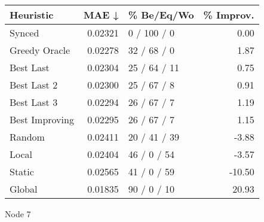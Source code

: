 \begin{tabular}{lrlr}
\toprule
\textbf{Heuristic} & \textbf{MAE ↓} & \textbf{\% Be/Eq/Wo} & \textbf{\% Improv.} \\
\midrule
            Synced &        0.02321 &          0 / 100 / 0 &                0.00 \\
     Greedy Oracle &        0.02278 &          32 / 68 / 0 &                1.87 \\
         Best Last &        0.02304 &         25 / 64 / 11 &                0.75 \\
       Best Last 2 &        0.02300 &          25 / 67 / 8 &                0.91 \\
       Best Last 3 &        0.02294 &          26 / 67 / 7 &                1.19 \\
    Best Improving &        0.02295 &          26 / 67 / 7 &                1.15 \\
            Random &        0.02411 &         20 / 41 / 39 &               -3.88 \\
             Local &        0.02404 &          46 / 0 / 54 &               -3.57 \\
            Static &        0.02565 &          41 / 0 / 59 &              -10.50 \\
            Global &        0.01835 &          90 / 0 / 10 &               20.93 \\
\bottomrule
\end{tabular}
\caption{Node 7}
\label{tab:iid_lr05_le1_bs4_7}

